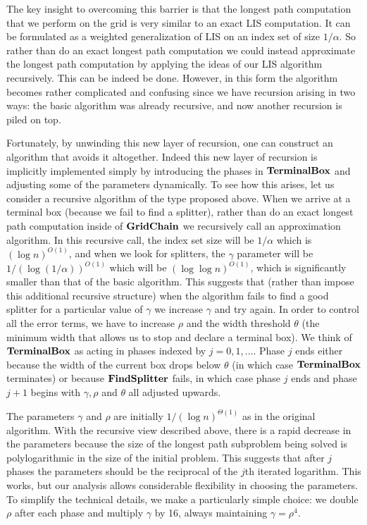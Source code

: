 \documentclass{acmsmall}
\newcommand{\terminalbox}{{\rm{\bf TerminalBox}}}
\newcommand{\gridprec}{\alpha}
\newcommand{\findsplitter}{{\rm {\bf FindSplitter}}}
\newcommand{\gridchain}{{\rm {\bf GridChain}}}
\begin{document}
The key insight to overcoming this barrier is that the longest path computation that we perform on the grid is very similar to an exact LIS computation. 
It
can be formulated
as a weighted generalization of LIS on an index set of size $1/\gridprec$.  So rather than do an exact longest path
computation we could instead approximate the longest path computation by applying the ideas of our LIS
algorithm recursively.   This can be indeed be done.  However, 
in this form the algorithm becomes rather complicated and confusing since we have recursion arising in two ways: the basic
algorithm was already recursive, and now another recursion is piled on top.

Fortunately, by  unwinding this new layer of recursion, one can construct
an algorithm that avoids it altogether.  Indeed this new layer of recursion is implicitly
implemented simply by introducing the phases in $\terminalbox$ and adjusting some of the parameters dynamically.  To see how this arises, let us consider a recursive algorithm of
the type proposed above.  When we arrive at a terminal box (because we fail to find a splitter), rather
than do an exact longest path computation inside
of $\gridchain$ we recursively call an approximation algorithm.  In this recursive call, the index set size will be $1/\gridprec$
which is $(\log n)^{O(1)}$, and when we look for splitters, the $\gamma$ parameter will be $1/(\log(1/\gridprec))^{O(1)}$
which will be $(\log\log n )^{O(1)}$, which is significantly smaller than that of the basic algorithm.  
This suggests
that (rather than impose this additional recursive structure) when the algorithm fails to find a good splitter
for a particular
value of $\gamma$ we increase $\gamma$ and try again.  
In order to control all the error terms,
we have to increase $\rho$ and the width threshold $\theta$ (the minimum width that allows us
to stop and declare a terminal box). 
We think of $\terminalbox$ as acting in phases indexed by $j=0,1,\ldots$.  
Phase $j$ ends either because the width of the current box drops below $\theta$ (in which
case $\terminalbox$ terminates) or because $\findsplitter$ fails, in which case phase $j$ ends and phase $j+1$ begins
with $\gamma,\rho$ and $\theta$ all adjusted upwards.

The parameters $\gamma$ and $\rho$ are initially $1/(\log n)^{\Theta(1)}$ as in the original algorithm.
With the recursive view described above,  there is a rapid decrease in the parameters because
the size of the longest path subproblem being solved is polylogarithmic in the size of the initial problem.
This suggests that after $j$ phases the parameters should be the reciprocal of the $j$th iterated logarithm.
This works, but our analysis allows considerable flexibility in choosing the parameters. To simplify
the technical details,
we make a particularly simple choice:
we  double $\rho$ after each phase and multiply $\gamma$ by 16, always maintaining $\gamma=\rho^4$.  
\end{document}
